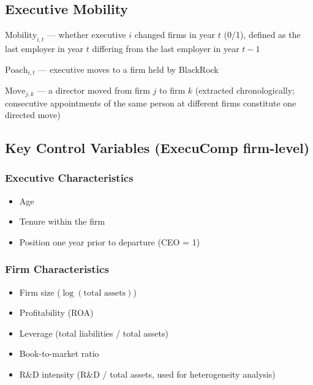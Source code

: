 \documentclass[11pt,a4paper]{article}
\begin{document}
\newpage

\subsection{Executive Mobility}

\begin{description}[leftmargin=*]
  \item[ExecuComp firm-level:] \(\text{Mobility}_{i,t}\) — whether executive \(i\) changed firms in year \(t\) (0/1), defined as the last employer in year \(t\) differing from the last employer in year \(t-1\)
  \item[ExecuComp directional:] \(\text{Poach}_{i,t}\) — executive moves to a firm held by BlackRock
  \item[Orbis pair-level:] \(\text{Move}_{j,k}\) — a director moved from firm \(j\) to firm \(k\) (extracted chronologically; consecutive appointments of the same person at different firms constitute one directed move)
\end{description}

\subsection{Key Control Variables (ExecuComp firm-level)}

\subsubsection*{Executive Characteristics}
\begin{itemize}[nosep]
  \item Age
  \item Tenure within the firm
  \item Position one year prior to departure (CEO = 1)
\end{itemize}

\subsubsection*{Firm Characteristics}
\begin{itemize}[nosep]
  \item Firm size (\(\log(\text{total assets})\))
  \item Profitability (ROA)
  \item Leverage (total liabilities / total assets)
  \item Book-to-market ratio
  \item R\&D intensity (R\&D / total assets, used for heterogeneity analysis)
\end{itemize}
\end{document}
